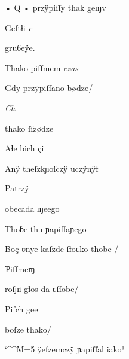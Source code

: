 {%

\splitverse

  • Q • przÿpiſſy thak geɱv

\indentVerse Geſtɬi \textit{c}  


\newverseline {} gru6eÿe.

\indentVerse Thako piſſmem \textit{czas} 


\newverseline {} Gdy  przÿpiſſano bødze/

\indentVerse \textit{Ch}  

\newpage


\splitverse

 thako ſſzødze

\indentVerse Aɬe bich çi 


\splitverse


\indentVerse Anÿ theſzkɲoſczÿ uczÿnÿƚ

\indentVerse Patrzÿ 


\splitverse

obecada ɱeego

\indentVerse Thoɓe thu ɲapiſſaɲego 


\splitverse

Boç ʋnye kaſzde ſƚoʋko thobe /

\indentVerse Ƥiſſmeɱ 


\splitverse

roſɲi gƚos da ʋſſobe/

\indentVerse Piſch gee 


\splitverse

 boſze thako/

\catcode `\^^M=5
\obeylines
\indentVerse ÿeſzemczÿ ɲapiſſaƚ iako¹

}
